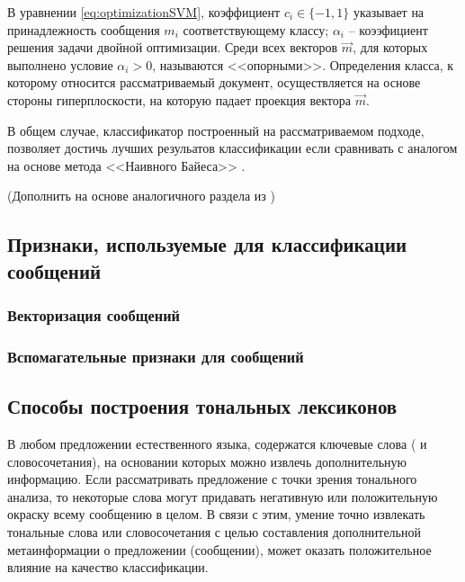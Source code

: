         В уравнении \ref{eq:optimizationSVM}, коэффициент $c_i \in \{-1, 1\}$
        указывает на принадлежность сообщения $m_i$ соответствующему классу;
        $\alpha_i$ -- коээфициент решения задачи двойной оптимизации. Среди всех
        векторов $\vec{m}$, для которых выполнено условие $\alpha_i > 0$, называются <<опорными>>.
        Определения класса, к которому относится рассматриваемый документ, осуществляется
        на основе стороны гиперплоскости, на которую падает проекция вектора $\vec{m}$.

        В общем случае, классификатор построенный на рассматриваемом подходе,
        позволяет достичь лучших резульатов классификации если сравнивать с
        аналогом на основе метода <<Наивного Байеса>> \cite{svmCompareVsNB}.

        (Дополнить на основе аналогичного раздела из \cite{islr})

    \subsection{Признаки, используемые для классификации сообщений}
        \subsubsection{Векторизация сообщений}

        \subsubsection{Вспомагательные признаки для сообщений}

    \subsection{Способы построения тональных лексиконов}

    В любом предложении естественного языка, содержатся ключевые слова ( и словосочетания),
    на основании которых можно извлечь дополнительную информацию. Если рассматривать
    предложение с точки зрения тонального анализа, то некоторые слова могут
    придавать негативную или положительную окраску всему сообщению в целом.
    В связи с этим, умение точно извлекать тональные слова или словосочетания
    с целью составления дополнительной метаинформации о предложении (сообщении),
    может оказать положительное влияние на качество классификации.

